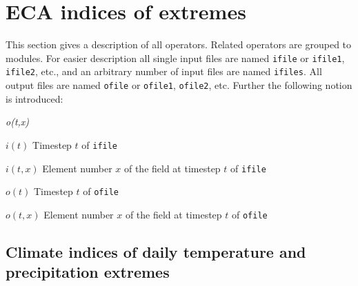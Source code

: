 \chapter{\label{refman}ECA indices of extremes}

This section gives a description of all operators. Related operators are grouped to modules.
For easier description all single input files are named {\tt ifile} or {\tt ifile1}, {\tt ifile2}, etc.,
and an arbitrary number of input files are named {\tt ifiles}.
All output files are named {\tt ofile} or {\tt ofile1}, {\tt ofile2}, etc.
Further the following notion is introduced:
\begin{defalist}{{\em o(t,x)}}
\item[\(i(t)\)\hfill]
Timestep \(t\) of {\tt ifile}
\item[\(i(t,x)\)\hfill]
Element number \(x\) of the field at timestep \(t\) of {\tt ifile}
\item[\(o(t)\)\hfill]
Timestep \(t\) of {\tt ofile}
\item[\(o(t,x)\)\hfill]
Element number \(x\) of the field at timestep \(t\) of {\tt ofile}
\end{defalist}



\section{Climate indices of daily temperature and precipitation extremes}



